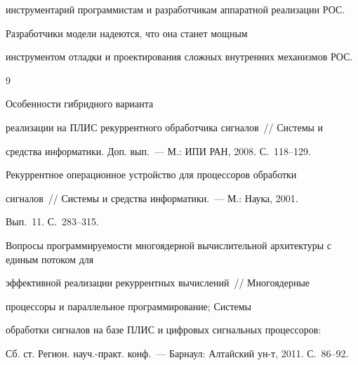инструментарий программистам и разработчикам аппаратной  реализации РОС.


   


   Разработчики модели надеются, что она станет мощным 


инструментом отладки и проектирования сложных  внутренних механизмов РОС.





 {\small\frenchspacing


{%




\begin{thebibliography}{9}









Особенности гибридного варианта 


реализации на ПЛИС рекуррентного обработчика сигналов~/\!\!/ Системы и 


средства информатики. Доп. вып.~---  М.: ИПИ РАН, 2008. С.~118--129.




 Рекуррентное операционное  устройство для процессоров обработки 


сигналов~/\!\!/ Системы и средства информатики.~--- М.: Наука, 2001. 


Вып.~11. С.~283--315. 






Вопросы программируемости  многоядерной вы\-чис\-ли\-тельной  архитектуры с единым потоком для 


эффективной реализации рекуррентных вычислений~/\!\!/ Многоядерные 


процессоры и параллельное программирование; Системы 


обработки сигналов на базе ПЛИС и  цифровых сигнальных процессоров: 


Сб. ст. Регион. науч.-практ. конф.~---  Барнаул: Алтайский ун-т, 2011. С.~86--92.




\end{thebibliography}}}
